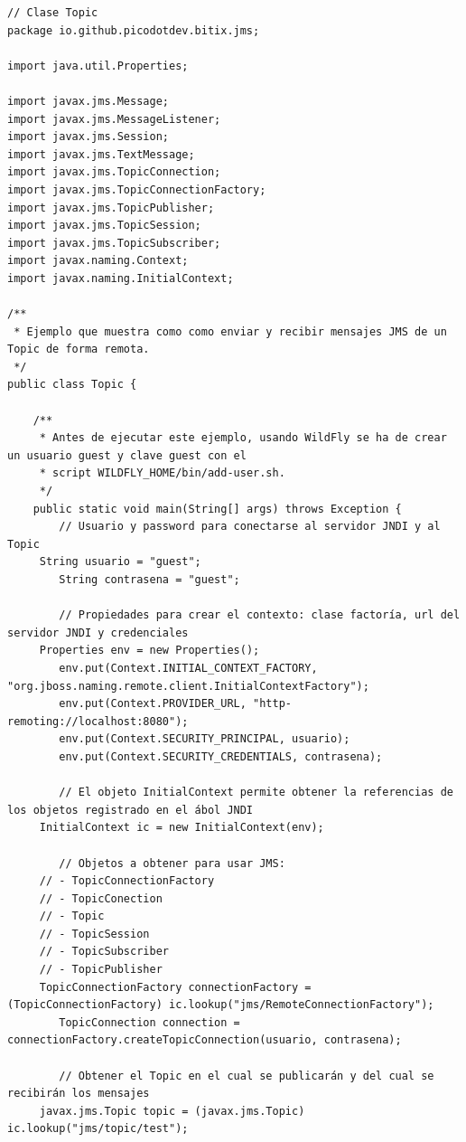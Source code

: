 \documentclass{article}
\begin{document}
\begin{lstlisting}[frame=single]
// Clase Topic
package io.github.picodotdev.bitix.jms;

import java.util.Properties;

import javax.jms.Message;
import javax.jms.MessageListener;
import javax.jms.Session;
import javax.jms.TextMessage;
import javax.jms.TopicConnection;
import javax.jms.TopicConnectionFactory;
import javax.jms.TopicPublisher;
import javax.jms.TopicSession;
import javax.jms.TopicSubscriber;
import javax.naming.Context;
import javax.naming.InitialContext;

/**
 * Ejemplo que muestra como como enviar y recibir mensajes JMS de un Topic de forma remota.
 */
public class Topic {

    /**
     * Antes de ejecutar este ejemplo, usando WildFly se ha de crear un usuario guest y clave guest con el 
     * script WILDFLY_HOME/bin/add-user.sh.
     */
    public static void main(String[] args) throws Exception {
        // Usuario y password para conectarse al servidor JNDI y al Topic
     String usuario = "guest";
        String contrasena = "guest";

        // Propiedades para crear el contexto: clase factoría, url del servidor JNDI y credenciales
     Properties env = new Properties();
        env.put(Context.INITIAL_CONTEXT_FACTORY, "org.jboss.naming.remote.client.InitialContextFactory");
        env.put(Context.PROVIDER_URL, "http-remoting://localhost:8080");
        env.put(Context.SECURITY_PRINCIPAL, usuario);
        env.put(Context.SECURITY_CREDENTIALS, contrasena);

        // El objeto InitialContext permite obtener la referencias de los objetos registrado en el ábol JNDI
     InitialContext ic = new InitialContext(env);

        // Objetos a obtener para usar JMS: 
     // - TopicConnectionFactory
     // - TopicConection
     // - Topic
     // - TopicSession
     // - TopicSubscriber
     // - TopicPublisher
     TopicConnectionFactory connectionFactory = (TopicConnectionFactory) ic.lookup("jms/RemoteConnectionFactory");
        TopicConnection connection = connectionFactory.createTopicConnection(usuario, contrasena);
        
        // Obtener el Topic en el cual se publicarán y del cual se recibirán los mensajes
     javax.jms.Topic topic = (javax.jms.Topic) ic.lookup("jms/topic/test");


\end{lstlisting}
\end{document}
